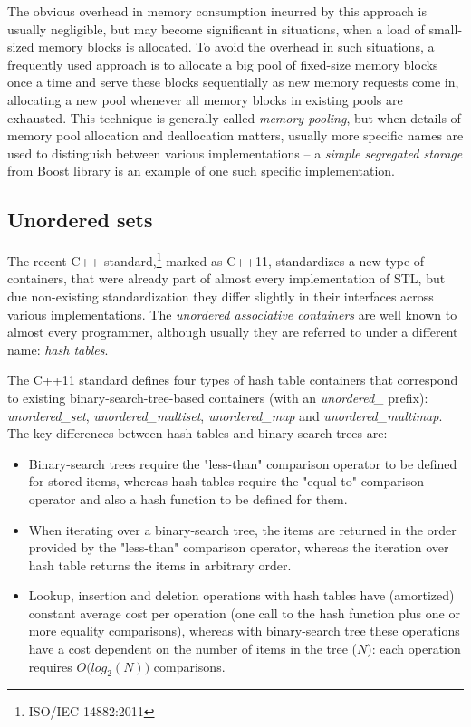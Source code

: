 The obvious overhead in memory consumption incurred by this approach is usually negligible,
but may become significant in situations, when a load of small-sized memory blocks is allocated.
To avoid the overhead in such situations, a frequently used approach is to allocate a big pool of
fixed-size memory blocks once a time and serve these blocks sequentially as new memory requests
come in, allocating a new pool whenever all memory blocks in existing pools are exhausted.
This technique is generally called \emph{memory pooling}, but when details of
memory pool allocation and deallocation matters, usually more specific names are used to
distinguish between various implementations --  a \emph{simple segregated storage} from Boost
library is an example of one such specific
implementation.


\subsection{Unordered sets}

The recent C++ standard,\footnote{ISO/IEC 14882:2011} marked as C++11, standardizes
a new type of containers, that were already part of almost every implementation of STL,
but due non-existing standardization they differ slightly in their interfaces across
various implementations.
The \emph{unordered associative containers} are well known to almost every programmer,
although usually they are referred to under a different name: \emph{hash tables}.

The C++11 standard defines four types of hash table containers that correspond to existing
binary-search-tree-based containers (with an \emph{unordered_} prefix):
\emph{unordered_set}, \emph{unordered_multiset}, \emph{unordered_map} and \emph{unordered_multimap}.
The key differences between hash tables and binary-search trees are:
\begin{itemize}
  \item Binary-search trees require the "less-than" comparison operator to be defined for stored items,
  whereas hash tables require the "equal-to" comparison operator and also a hash function to be
  defined for them.
  \item When iterating over a binary-search tree, the items are returned in the order provided by
  the "less-than" comparison operator, whereas the iteration over hash table returns the items in arbitrary
  order.
  \item Lookup, insertion and deletion operations with hash tables have (amortized) constant
  average cost per operation (one call to the hash function plus one or more equality comparisons),
  whereas with binary-search tree these operations have a cost dependent on the number of items
  in the tree ($N$): each operation requires $O\big(log_2(N)\big)$ comparisons.
\end{itemize}

